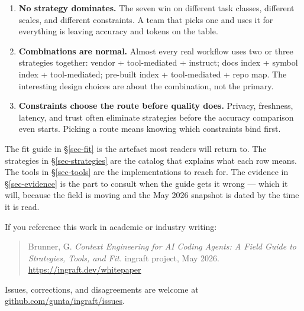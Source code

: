 \documentclass[
  11pt,
  letterpaper,
  numbers=noendperiod,
  parskip=half]{scrartcl}
\providecommand{\tightlist}{%
  \setlength{\itemsep}{0pt}\setlength{\parskip}{0pt}}
\begin{document}
\begin{enumerate}
\def\labelenumi{\arabic{enumi}.}
\tightlist
\item
  \textbf{No strategy dominates.} The seven win on different task
  classes, different scales, and different constraints. A team that
  picks one and uses it for everything is leaving accuracy and tokens
  on the table.
\item
  \textbf{Combinations are normal.} Almost every real workflow uses
  two or three strategies together: vendor + tool-mediated + instruct;
  docs index + symbol index + tool-mediated; pre-built index +
  tool-mediated + repo map. The interesting design choices are about
  the combination, not the primary.
\item
  \textbf{Constraints choose the route before quality does.} Privacy,
  freshness, latency, and trust often eliminate strategies before the
  accuracy comparison even starts. Picking a route means knowing
  which constraints bind first.
\end{enumerate}

The fit guide in \S\ref{sec-fit} is the artefact most readers will
return to. The strategies in \S\ref{sec-strategies} are the catalog
that explains what each row means. The tools in \S\ref{sec-tools} are
the implementations to reach for. The evidence in \S\ref{sec-evidence}
is the part to consult when the guide gets it wrong --- which it will,
because the field is moving and the May 2026 snapshot is dated by the
time it is read.

\begin{tcolorbox}[enhanced jigsaw, arc=.35mm, bottomrule=.15mm, bottomtitle=1mm, breakable, colback=white, colbacktitle=paper-callout-tip-color!10!white, colframe=paper-callout-tip-color-frame, coltitle=black, left=2mm, leftrule=.75mm, opacityback=0, opacitybacktitle=0.6, rightrule=.15mm, title=\textcolor{paper-callout-tip-color}{\faLightbulb}\hspace{0.5em}{Citation}, titlerule=0mm, toprule=.15mm, toptitle=1mm]

If you reference this work in academic or industry writing:

\begin{quote}
Brunner, G. \emph{Context Engineering for AI Coding Agents: A Field
Guide to Strategies, Tools, and Fit.} ingraft project, May 2026.
\url{https://ingraft.dev/whitepaper}
\end{quote}

Issues, corrections, and disagreements are welcome at
\href{https://github.com/gunta/ingraft/issues}{github.com/gunta/ingraft/issues}.

\end{tcolorbox}
\end{document}

